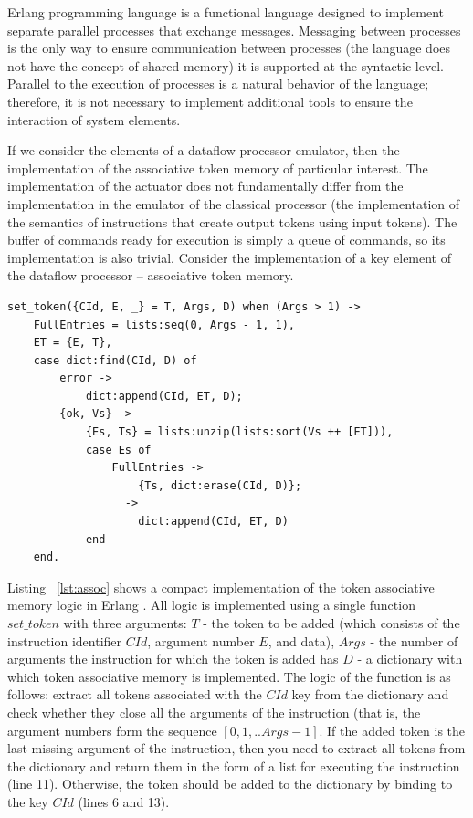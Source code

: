 \documentclass[
11pt,%
tightenlines,%
twoside,%
onecolumn,%
nofloats,%
nobibnotes,%
nofootinbib,%
superscriptaddress,%
noshowpacs,%
centertags]%
{revtex4}
\begin{document}
Erlang programming language is a functional language designed to implement separate parallel processes that exchange messages. Messaging between processes is the only way to ensure communication between processes (the language does not have the concept of shared memory) it is supported at the syntactic level. Parallel to the execution of processes is a natural behavior of the language; therefore, it is not necessary to implement additional tools to ensure the interaction of system elements.

If we consider the elements of a dataflow processor emulator, then the implementation of the associative token memory of particular interest. The implementation of the actuator does not fundamentally differ from the implementation in the emulator of the classical processor (the implementation of the semantics of instructions that create output tokens using input tokens). The buffer of commands ready for execution is simply a queue of commands, so its implementation is also trivial. Consider the implementation of a key element of the dataflow processor -- associative token memory.

\begin{lstlisting}[caption={Implementation of the logic of the associative token memory.},label={lst:assoc}]
set_token({CId, E, _} = T, Args, D) when (Args > 1) ->
	FullEntries = lists:seq(0, Args - 1, 1),
	ET = {E, T},
	case dict:find(CId, D) of
		error ->
			dict:append(CId, ET, D);
		{ok, Vs} ->
			{Es, Ts} = lists:unzip(lists:sort(Vs ++ [ET])),
			case Es of
				FullEntries ->
					{Ts, dict:erase(CId, D)};
				_ ->
					dict:append(CId, ET, D)
			end
	end.
\end{lstlisting}

Listing ~\ref{lst:assoc} shows a compact implementation of the token associative memory logic in Erlang \cite{Armstrong}.
All logic is implemented using a single function $set\_token$ with three arguments: $T$ - the token to be added (which consists of the instruction identifier $CId$, argument number $E$, and data), $Args$ - the number of arguments the instruction for which the token is added has $D$ - a dictionary with which token associative memory is implemented.
The logic of the function is as follows: extract all tokens associated with the $CId$ key from the dictionary and check whether they close all the arguments of the instruction (that is, the argument numbers form the sequence $[0, 1, .. Args - 1]$.
If the added token is the last missing argument of the instruction, then you need to extract all tokens from the dictionary and return them in the form of a list for executing the instruction (line 11).
Otherwise, the token should be added to the dictionary by binding to the key $CId$ (lines 6 and 13).
\end{document}
